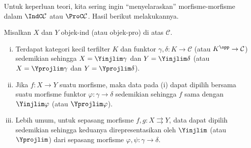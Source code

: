 Untuk keperluan teori, kita sering ingin ``menyelaraskan'' morfisme-morfisme dalam $\IndC\mathcal{C}$ atau $\ProC\mathcal{C}$. Hasil berikut melakukannya.

\begin{lemma}\label{prop:ind-object-morphism}
	Misalkan $X$ dan $Y$ objek-ind (atau objek-pro) di atas $\mathcal{C}$.
	\begin{enumerate}[(i)]
		\item Terdapat kategori kecil terfilter $K$ dan funktor $\gamma,\delta:K\to\mathcal{C}$ (atau $K^{\opp}\to\mathcal{C}$) sedemikian sehingga $X=\Yinjlim\gamma$ dan $Y=\Yinjlim\delta$ (atau $X=\Yprojlim\gamma$ dan $Y=\Yprojlim\delta$).
		\item Jika $f:X\to Y$ suatu morfisme, maka data pada (i) dapat dipilih bersama suatu morfisme funktor $\varphi:\gamma\to\delta$ sedemikian sehingga $f$ sama dengan $\Yinjlim\varphi$ (atau $\Yprojlim\varphi$).
		
		\item Lebih umum, untuk sepasang morfisme $f,g:X\rightrightarrows Y$, data dapat dipilih sedemikian sehingga keduanya direpresentasikan oleh $\Yinjlim$ (atau $\Yprojlim$) dari sepasang morfisme $\varphi,\psi:\gamma\to\delta$.
	\end{enumerate}
\end{lemma}
